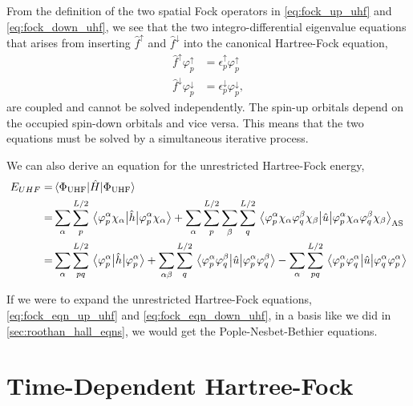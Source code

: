 From the definition of the two spatial Fock operators in \autoref{eq:fock_up_uhf} and 
\autoref{eq:fock_down_uhf},
we see that the two integro-differential eigenvalue equations that arises from inserting
$\hat{f}^\uparrow$ and $\hat{f}^\downarrow$ into the canonical Hartree-Fock equation,
\begin{align}
    \label{eq:fock_eqn_up_uhf}
    \hat{f}^\uparrow \varphi_p^\uparrow &= \epsilon_p^\uparrow\varphi_p^\uparrow \\
    \label{eq:fock_eqn_down_uhf}
    \hat{f}^\downarrow \varphi_p^\downarrow &= \epsilon_p^\downarrow\varphi_p^\downarrow,
\end{align}
are 
coupled and cannot be solved independently. The spin-up orbitals depend on the occupied spin-down 
orbitals and vice versa. This means that the two equations must be solved by a simultaneous 
iterative process.

We can also derive an equation for the unrestricted Hartree-Fock energy,
\begin{equation}
    \begin{aligned}
    E_{UHF} =& \mel{\Phi_{\text{UHF}}}{\hat{H}}{\Phi_{\text{UHF}}}\\
    =& \sum_\alpha\sum_p^{L/2} \mel{\varphi_p^\alpha\chi_\alpha}{\hat{h}}{\varphi_p^\alpha\chi_\alpha}
    + \sum_\alpha\sum_p^{L/2}\sum_\beta\sum_q^{L/2}
        \mel{\varphi_p^\alpha\chi_\alpha\varphi_q^\beta\chi_\beta}{\hat{u}}
            {\varphi_p^\alpha\chi_\alpha\varphi_q^\beta\chi_\beta}_\text{AS} \\
    =& \sum_\alpha\sum_{pq}^{L/2} \mel{\varphi_p^\alpha}{\hat{h}}{\varphi_p^\alpha} 
    + \sum_{\alpha\beta}\sum_q^{L/2}
        \mel{\varphi_p^\alpha\varphi_q^\beta}{\hat{u}}{\varphi_p^\alpha\varphi_q^\beta} 
    - \sum_\alpha\sum_{pq}^{L/2}
        \mel{\varphi_p^\alpha\varphi_q^\alpha}{\hat{u}}{\varphi_q^\alpha\varphi_p^\alpha}
    \end{aligned}
\end{equation}

If we were to expand the unrestricted Hartree-Fock equations, \autoref{eq:fock_eqn_up_uhf} and 
\autoref{eq:fock_eqn_down_uhf}, in a basis like we did in \autoref{sec:roothan_hall_eqns}, we 
would get the Pople-Nesbet-Bethier equations\cite{berthier1954extension,pople1954self}.

\section{Time-Dependent Hartree-Fock}

